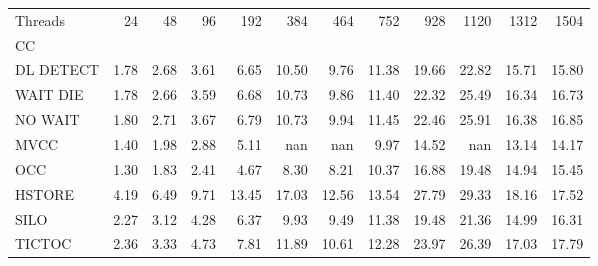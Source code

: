 \begin{tabular}{lrrrrrrrrrrr}
\toprule
Threads &  24   &  48   &  96   &  192  &  384  &  464  &  752  &  928  &  1120 &  1312 &  1504 \\
CC        &       &       &       &       &       &       &       &       &       &       &       \\
\midrule
DL DETECT &  1.78 &  2.68 &  3.61 &  6.65 & 10.50 &  9.76 & 11.38 & 19.66 & 22.82 & 15.71 & 15.80 \\
WAIT DIE  &  1.78 &  2.66 &  3.59 &  6.68 & 10.73 &  9.86 & 11.40 & 22.32 & 25.49 & 16.34 & 16.73 \\
NO WAIT   &  1.80 &  2.71 &  3.67 &  6.79 & 10.73 &  9.94 & 11.45 & 22.46 & 25.91 & 16.38 & 16.85 \\
MVCC      &  1.40 &  1.98 &  2.88 &  5.11 &   nan &   nan &  9.97 & 14.52 &   nan & 13.14 & 14.17 \\
OCC       &  1.30 &  1.83 &  2.41 &  4.67 &  8.30 &  8.21 & 10.37 & 16.88 & 19.48 & 14.94 & 15.45 \\
HSTORE    &  4.19 &  6.49 &  9.71 & 13.45 & 17.03 & 12.56 & 13.54 & 27.79 & 29.33 & 18.16 & 17.52 \\
SILO      &  2.27 &  3.12 &  4.28 &  6.37 &  9.93 &  9.49 & 11.38 & 19.48 & 21.36 & 14.99 & 16.31 \\
TICTOC    &  2.36 &  3.33 &  4.73 &  7.81 & 11.89 & 10.61 & 12.28 & 23.97 & 26.39 & 17.03 & 17.79 \\
\bottomrule
\end{tabular}
